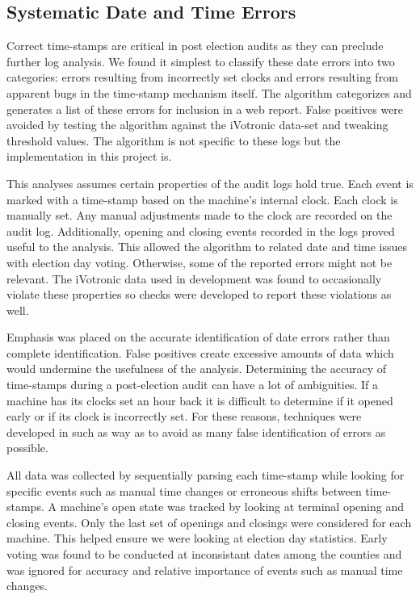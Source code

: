 \subsection{Systematic Date and Time Errors}\label{an:date} Correct time-stamps
are critical in post election audits as they can preclude further log analysis.
We found it simplest to classify these date errors into two categories: errors
resulting from incorrectly set clocks and errors resulting from apparent bugs in
the time-stamp mechanism itself. The algorithm categorizes and generates a list
of these errors for inclusion in a web report. False positives were avoided by
testing the algorithm against the iVotronic data-set and tweaking threshold values.
The algorithm is not specific to these logs but the implementation in this
project is.

This analyses assumes certain properties of the audit logs hold true. Each event
is marked with a time-stamp based on the machine's internal clock. Each clock is
manually set.  Any manual adjustments made to the clock are recorded on the
audit log. Additionally, opening and closing events recorded in the logs proved
useful to the analysis. This allowed the algorithm to related date and time
issues with election day voting.  Otherwise, some of the reported errors might
not be relevant. The iVotronic data used in development was found to
occasionally violate these properties so checks were developed to report these
violations as well.

Emphasis was placed on the accurate identification of date errors rather than
complete identification. False positives create excessive amounts of data which
would undermine the usefulness of the analysis. Determining the accuracy of
time-stamps during a post-election audit can have a lot of ambiguities. If a
machine has its clocks set an hour back it is difficult to determine if it
opened early or if its clock is incorrectly set. For these reasons, techniques
were developed in such as way as to avoid as many false identification of errors
as possible.

All data was collected by sequentially parsing each time-stamp while looking for
specific events such as manual time changes or erroneous shifts between
time-stamps. A machine's open state was tracked by looking at terminal opening
and closing events. Only the last set of openings and closings were considered
for each machine. This helped ensure we were looking at election day statistics.
Early voting was found to be conducted at inconsistant dates among the counties
and was ignored for accuracy and relative importance of events such as manual
time changes.



